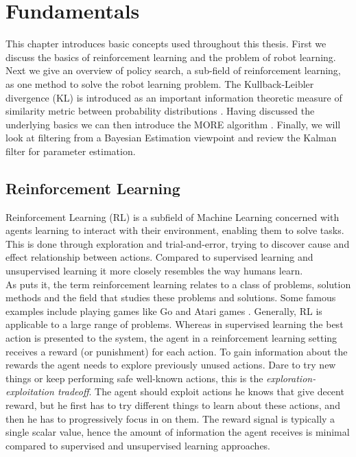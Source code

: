 
\chapter{Fundamentals}
This chapter introduces basic concepts used throughout this thesis.
First we discuss the basics of reinforcement learning and
the problem of robot learning.
Next we give an overview of policy search,
a sub-field of reinforcement learning,
as one method to solve the robot learning problem.
The Kullback-Leibler divergence (KL) is
introduced as an important information theoretic
measure of similarity metric between probability
distributions \citep{kullback1951information}.
Having discussed the underlying basics we can then
introduce the MORE algorithm \citep{abdolmaleki2015model}.
Finally, we will look at filtering from a Bayesian Estimation viewpoint and
review the Kalman filter for parameter estimation.

\section{Reinforcement Learning}
Reinforcement Learning (RL) is a subfield of Machine Learning concerned with agents
learning to interact with their environment, enabling them to solve tasks.
This is done through exploration and trial-and-error, trying to discover
cause and effect relationship between actions.
Compared to supervised learning and unsupervised learning it
more closely resembles the way humans learn. \\
As \citet{sutton2018reinforcement} puts it,
the term reinforcement learning relates to a class of problems,
solution methods and the field that studies these problems and solutions.
Some famous examples include playing games like Go
\citep{silver2016mastering} and Atari games \citep{mnih2013playing}.
Generally, RL is applicable to a large range of problems.
Whereas in supervised learning the best action is presented to the system,
the agent in a reinforcement learning setting receives a
reward (or punishment) for each action.
To gain information about the rewards the agent needs
to explore previously unused actions.
Dare to try new things or keep performing safe
well-known actions, this is the \textit{exploration-exploitation tradeoff}.
The agent should exploit actions he knows that
give decent reward, but he first
has to try different things to learn about these actions,
and then he has to progressively focus in on them.
The reward signal is typically a single scalar value, hence the amount of information
the agent receives is minimal compared to
supervised and unsupervised learning approaches.

